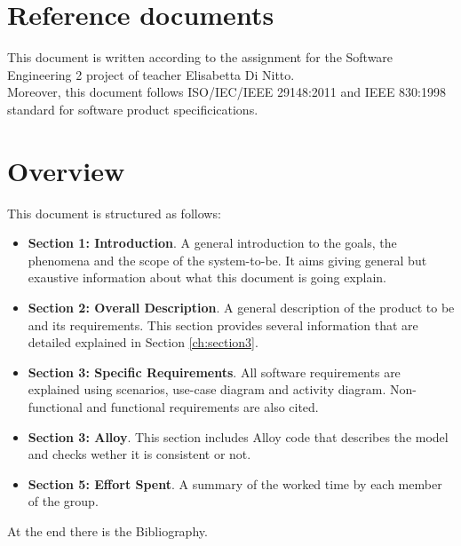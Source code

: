 \section{Reference documents}
This document is written according to the assignment for the Software Engineering 2 project \cite{se-assignments} of teacher Elisabetta Di Nitto.\\
Moreover, this document follows ISO/IEC/IEEE 29148:2011 \cite{ieee-29148} and IEEE 830:1998 \cite{ieee-830} standard for software product specificications.

\section{Overview}
This document is structured as follows:
\begin{itemize}
  \setlength{\itemindent}{-.4in}
  \item[] \textbf{Section 1: Introduction}. A general introduction to the goals, the phenomena and the scope of the system-to-be. It aims giving general but exaustive information about what this document is going explain.
  \item[] \textbf{Section 2: Overall Description}. A general description of the product to be and its requirements. This section provides several information that are detailed explained in Section \ref{ch:section3}.
  \item[] \textbf{Section 3: Specific Requirements}. All software requirements are explained using scenarios, use-case diagram and activity diagram. Non-functional and functional requirements are also cited.
  \item[] \textbf{Section 3: Alloy}. This section includes Alloy code that describes the model and checks wether it is consistent or not.
  \item[] \textbf{Section 5: Effort Spent}. A summary of the worked time by each member of the group.
\end{itemize}
At the end there is the Bibliography.
